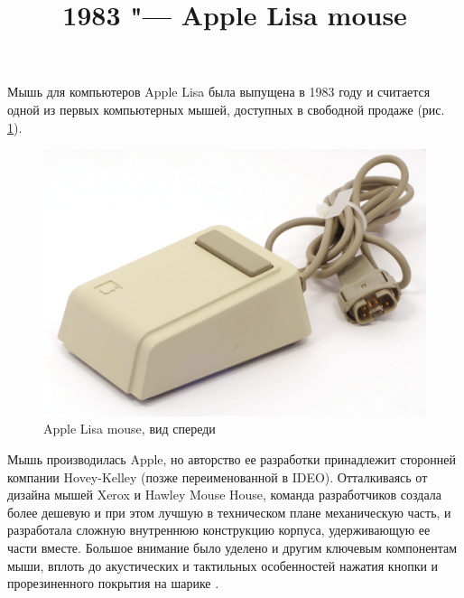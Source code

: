 \documentclass[11pt, a4paper]{article}
\begin{document}
\title{1983 "--- Apple Lisa mouse}
\date{}
\maketitle

Мышь для компьютеров Apple Lisa была выпущена в 1983 году \cite{mouses} и считается одной из первых компьютерных мышей, доступных в свободной продаже (рис. \ref{fig:AppleLisaPic}).

\begin{figure}[h]
   \centering
    \includegraphics[scale=0.5]{1983_apple_lisa_mouse/applenorm_30.jpg}
    \caption{Apple Lisa mouse, вид спереди}
    \label{fig:AppleLisaPic}
\end{figure}

Мышь производилась Apple, но авторство ее разработки принадлежит сторонней компании Hovey-Kelley (позже переименованной в IDEO). Отталкиваясь от дизайна мышей Xerox и Hawley Mouse House, команда разработчиков создала более дешевую и при этом лучшую в техническом плане механическую часть, и разработала сложную внутреннюю конструкцию корпуса, удерживающую ее части вместе. Большое внимание было уделено и другим ключевым компонентам мыши, вплоть до акустических и тактильных особенностей нажатия кнопки и прорезиненного покрытия на шарике \cite{ideo}.
\end{document}
